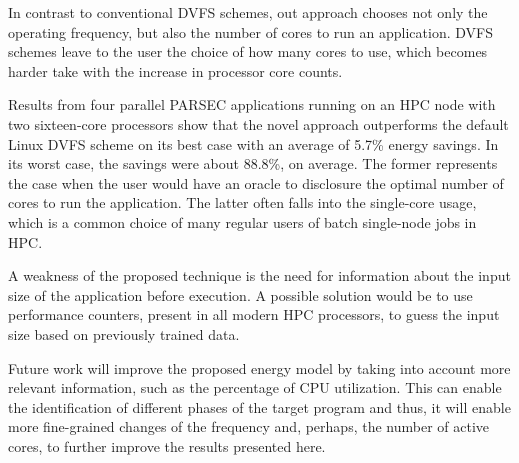 In contrast to conventional DVFS schemes, out approach chooses not only the operating frequency, but also the number of cores to run an application. DVFS schemes leave to the user the choice of how many cores to use, which becomes harder take with the increase in processor core counts.

Results from four parallel PARSEC applications running on an HPC node with two sixteen-core processors show that the novel approach outperforms the default Linux DVFS scheme on its best case with an average of 5.7\% energy savings. In its worst case, the savings were about 88.8\%, on average. The former represents the case when the user would have an oracle to disclosure the optimal number of cores to run the application. The latter often falls into the single-core usage, which is a common choice of many regular users of batch single-node jobs in HPC.



A weakness of the proposed technique is the need for information about the input size of the application before execution. A possible solution would be to use performance counters, present in all modern HPC processors, to guess the input size based on previously trained data.

Future work will improve the proposed energy model by taking into account more relevant information, such as the percentage of CPU utilization. This can enable the identification of different phases of the target program and thus, it will enable more fine-grained changes of the frequency and, perhaps, the number of active cores, to further improve the results presented here.


